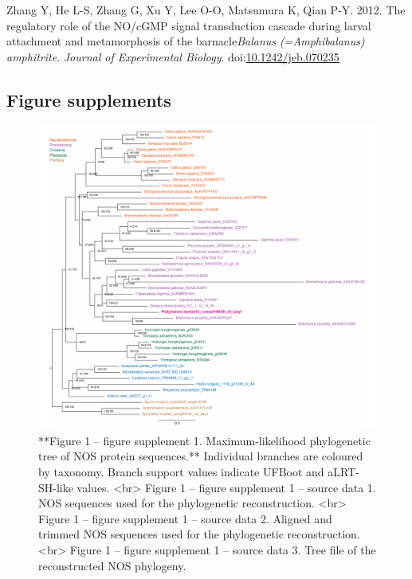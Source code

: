 \documentclass[
  10pt,
  onecolumn]{article}
\newlength{\cslhangindent}
\newlength{\cslentryspacingunit} %
\newenvironment{CSLReferences}[2] %
 {%
  \setlength{\parindent}{0pt}
  \ifodd #1
  \let\oldpar\par
  \def\par{\hangindent=\cslhangindent\oldpar}
  \fi
  \setlength{\parskip}{#2\cslentryspacingunit}
 }%
 {}
\begin{document}
\begin{CSLReferences}{1}{0}
\leavevmode{}%
Zhang Y, He L-S, Zhang G, Xu Y, Lee O-O, Matsumura K, Qian P-Y. 2012.
The regulatory role of the NO/cGMP signal transduction cascade during
larval attachment and metamorphosis of the barnacle{\emph{Balanus
(=Amphibalanus) amphitrite}}. \emph{Journal of Experimental Biology}.
doi:\href{https://doi.org/10.1242/jeb.070235}{10.1242/jeb.070235}

\end{CSLReferences}

\hypertarget{figure-supplements}{%
\subsection{Figure supplements}\label{figure-supplements}}

\begin{figure}
\includegraphics[width=27.78in]{figures/Fig1_sup1} \caption{**Figure 1 -- figure supplement 1. Maximum-likelihood phylogenetic tree of NOS protein sequences.** Individual branches are coloured by taxonomy. Branch support values indicate UFBoot and aLRT-SH-like values. <br> Figure 1 -- figure supplement 1 -- source data 1. NOS sequences used for the phylogenetic reconstruction. <br> Figure 1 -- figure supplement 1 -- source data 2. Aligned and trimmed NOS sequences used for the phylogenetic reconstruction. <br> Figure 1 -- figure supplement 1 -- source data 3. Tree file of the reconstructed NOS phylogeny. }\label{fig:unnamed-chunk-9}
\end{figure}
\end{document}
